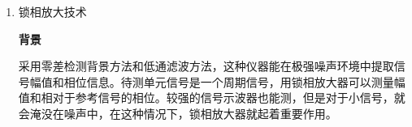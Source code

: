 \begin{enumerate}
	\[
	\mathrm{SNIR} = \frac{\mathrm{SNR}_{\text{out}}}{\mathrm{SNR}_{\text{in}}}
	\]
	
	或以分贝形式表示为：
	
	\[
	\mathrm{SNIR}_{\mathrm{dB}} = \mathrm{SNR}_{\text{out, dB}} - \mathrm{SNR}_{\text{in, dB}}
	\]
	
	其中 \( \mathrm{SNR}_{\text{in}} \) 是处理前的信噪比，\( \mathrm{SNR}_{\text{out}} \) 是处理后的信噪比。信噪改善比的物理意义是，如果 SNIR > 1（或 \( \mathrm{SNIR}_{\mathrm{dB}} > 0 \)），表示信噪比得到改善，信号质量提高；如果 SNIR = 1（或 \( \mathrm{SNIR}_{\mathrm{dB}} = 0 \)），表示信噪比无变化；而如果 SNIR < 1（或 \( \mathrm{SNIR}_{\mathrm{dB}} < 0 \)），则信噪比降低，信号质量下降。例如，通过某种处理方法降低噪声功率而保持信号功率不变，则信噪改善比可以表示为：
	
	\[
	\mathrm{SNIR} = \frac{P_{\text{noise, in}}}{P_{\text{noise, out}}}
	\]
	
	这意味着信噪改善比等于噪声功率减少的倍数。
	
	以一个具体的实例来说明信噪比和信噪改善比的计算。假设一个系统中，信号功率为 \( P_{\text{signal}} = 50 \, \text{mW} \)，噪声功率为 \( P_{\text{noise}} = 5 \, \text{mW} \)。则信噪比为：
	
	\[
	\mathrm{SNR} = \frac{50}{5} = 10
	\]
	
	转换为分贝为：
	
	\[
	\mathrm{SNR}_{\mathrm{dB}} = 10 \log_{10}(10) = 10 \, \text{dB}
	\]
	
	如果通过某种处理方法将噪声功率降低到 \( P_{\text{noise, out}} = 1 \, \text{mW} \)，信号功率不变，则新的信噪比为：
	
	\[
	\mathrm{SNR}_{\text{out}} = \frac{50}{1} = 50
	\]
	
	转换为分贝为：
	
	\[
	\mathrm{SNR}_{\text{out, dB}} = 10 \log_{10}(50) \approx 16.99 \, \text{dB}
	\]
	
	信噪改善比为：
	
	\[
	\mathrm{SNIR} = \frac{50}{10} = 5
	\]
	
	或以分贝表示为：
	
	\[
	\mathrm{SNIR}_{\mathrm{dB}} = 16.99 \, \text{dB} - 10 \, \text{dB} = 6.99 \, \text{dB}
	\]
	
	这表示经过处理，信噪比提高了约 7 dB。
	
	\item 锁相放大技术
	
	\textbf{背景}
	
	采用零差检测背景方法和低通滤波方法，这种仪器能在极强噪声环境中提取信号幅值和相位信息。待测单元信号是一个周期信号，用锁相放大器可以测量幅值和相对于参考信号的相位。较强的信号示波器也能测，但是对于小信号，就会淹没在噪声中，在这种情况下，锁相放大器就起着重要作用。
	

\end{enumerate}
